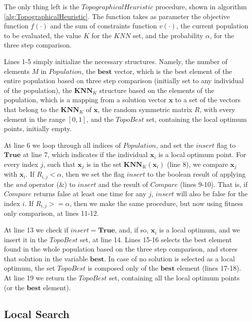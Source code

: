 The only thing left is the $TopographicalHeuristic$ procedure, shown in algorithm \ref{alg:TopographicalHeuristic}. The function takes as parameter the objective function $f(\cdot)$ and the sum of constraints function $v(\cdot)$, the current population to be evaluated, the value $K$ for the $KNN$ set, and the probability $\alpha$, for the three step comparison.





Lines 1-5 simply initialize the necessary structures. Namely, the number of elements $M$ in $Population$, the $\bm{best}$ vector, which is the best element of the entire population based on three step comparison (initially set to any individual of the population), the $\bm{KNN}_K$ structure based on the elements of the population, which is a mapping from a solution vector $\bm{x}$ to a set of the vectors that belong to the $\bm{KNN}_K$ of $\bm{x}$, the random symmetric matrix $R$, with every element in the range $[0, 1]$, and the $TopoBest$ set, containing the local optimum points, initially empty.

At line 6 we loop through all indices of $Population$, and set the $insert$ flag to $\bm{True}$ at line 7, which indicates if the individual $\bm{x}_i$ is a local optimum point. For every index $j$, such that $\bm{x}_j$ is in the set $\bm{KNN}_K(\bm{x}_i)$ (line 8), we compare $\bm{x}_j$ with $\bm{x}_i$. If $R_{i, j} < \alpha$, then we set the flag $insert$ to the boolean result of applying the \textit{and} operator ($\&$) to $insert$ and the result of $Compare$ (lines 9-10). That is, if $Compare$ returns false at least one time for any $j$, $insert$ will also be false for the index $i$. If $R_{i, j} >= \alpha$, then we make the same procedure, but now using fitness only comparison, at lines 11-12.

At line 13 we check if $insert = \bm{True}$, and, if so, $\bm{x}_i$ is a local optimum, and we insert it in the $TopoBest$ set, at line 14. Lines 15-16 selects the best element found in the whole population based on the three step comparison, and stores that solution in the variable $\bm{best}$. In case of no solution is selected as a local optimum, the set $TopoBest$ is composed only of the $\bm{best}$ element (lines 17-18). At line 19 we return the $TopoBest$ set, containing all the local optimum points (or the $\bm{best}$ element).


\subsection{Local Search}

